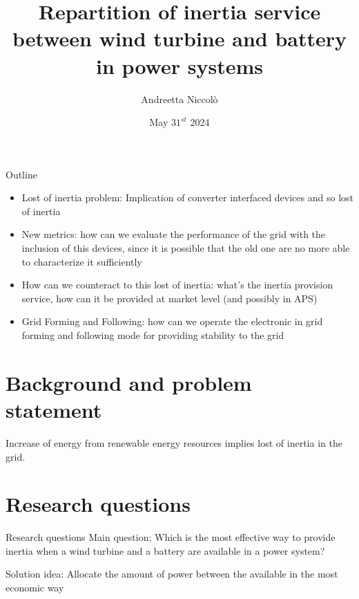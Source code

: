 \documentclass[aspectratio=169, 12pt]{beamer}
\title{ Repartition of inertia service between wind turbine and battery in power systems }
\author{Andreetta Niccolò}
\date{May $31^{st}$ 2024}
\begin{document}
  \maketitle

  \begin{frame}[fragile]{Outline}
    \tableofcontents
  \end{frame}

  \begin{frame}
    \begin{itemize}
      \item Lost of inertia problem: Implication of converter interfaced devices and so lost of inertia
      \item New metrics: how can we evaluate the performance of the grid with the inclusion of this devices, since it is possible that the old one are no more able to characterize it sufficiently
      \item How can we counteract to this lost of inertia: what's the inertia provision service, how can it be provided at market level (and possibly in APS)
      \item Grid Forming and Following: how can we operate the electronic in grid forming and following mode for providing stability to the grid
    \end{itemize}
  \end{frame}

  \section{Background and problem statement}
  \begin{frame}{\insertsection}
    Increase of energy from renewable energy resources implies lost of inertia in the grid. 

  \end{frame}
  
  \section{Research questions}
  \begin{frame}{Research questions}
    \textcolor{NTNUBlue}{Main question}: Which is the most effective way to provide inertia when a wind turbine and a battery are available in a power system?
    
    \textcolor{NTNUOrange}{Solution idea}: Allocate the amount of power between the available in the most economic way
  \end{frame}
\end{document}
